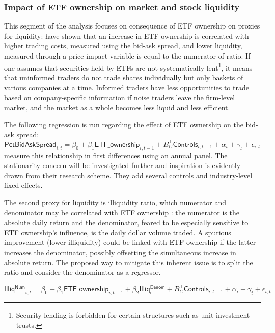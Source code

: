 \subsubsection{Impact of ETF ownership on market and stock liquidity}
\label{subsec:Method:Liquidity}
This segment of the analysis focuses on consequence of ETF ownership on proxies for liquidity: \textcite{Israeli2017} have shown that an increase in ETF ownership is correlated with higher trading costs, measured using the bid-ask spread, and lower liquidity, measured through a price-impact variable is equal to the numerator of \textcite{Amihud2002} ratio. If one assumes that securities held by ETFs are not systematically lent\footnote{Security lending is forbidden for certain structures such as unit investment trusts.}, it means that uninformed traders do not trade shares individually but only baskets of various companies at a time. Informed traders have less opportunities to trade based on company-specific information if noise traders leave the firm-level market, and the market as a whole becomes less liquid and less efficient.

The following regression is run regarding the effect of ETF ownership on the bid-ask spread:
\begin{equation}
 \mathsf{PctBidAskSpread}_{i,t} = \beta_{0} + \beta_{1} \mathsf{ETF\_ownership}_{i, t - 1} + B_{C}^{\intercal} \mathsf{Controls}_{i, t - 1} + \alpha_{i} + \gamma_{t} + \epsilon_{i, t}
\end{equation}
\textcite{Israeli2017} measure this relationship in first differences using an annual panel. The stationarity concern will be investigated further and inspiration is evidently drawn from their research scheme. They add several controls and industry-level fixed effects.

The second proxy for liquidity is \textcite{Amihud2002} illiquidity ratio, which numerator and denominator may be correlated with ETF ownership : the numerator is the absolute daily return and the denominator, feared to be especially sensitive to ETF ownership's influence, is the daily dollar volume traded. A spurious improvement (lower illiquidity) could be linked with ETF ownership if the latter increases the denominator, possibly offsetting the simultaneous increase in absolute return. The proposed way to mitigate this inherent issue is to split the ratio and consider the denominator as a regressor.
 
\begin{equation}
   \mathsf{Illiq^{Num}}_{i,t} = \beta_{0} + \beta_{1} \mathsf{ETF\_ownership}_{i, t - 1} + \beta_{2} \mathsf{Illiq^{Denom}_{i,t}} + B_{C}^{\intercal} \mathsf{Controls}_{i, t- 1} + \alpha_{i} + \gamma_{t} + \epsilon_{i, t}
\end{equation}

